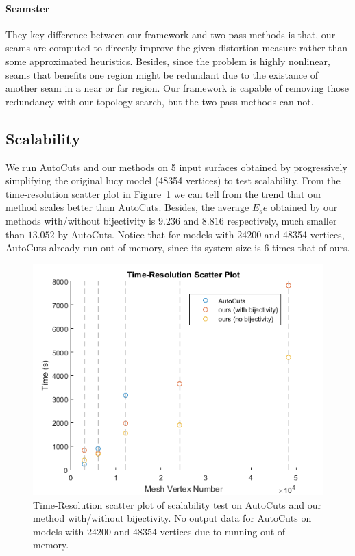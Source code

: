 \paragraph{Seamster}
They key difference between our framework and two-pass methods is that, our seams are computed to directly improve the given distortion measure rather than some approximated heuristics. Besides, since the problem is highly nonlinear, seams that benefits one region might be redundant due to the existance of another seam in a near or far region. Our framework is capable of removing those redundancy with our topology search, but the two-pass methods can not.


\subsection{Scalability}
We run AutoCuts and our methods on 5 input surfaces obtained by progressively simplifying the original lucy model (48354 vertices) to test scalability. From the time-resolution scatter plot in Figure~\ref{fig:time_res_scalability} we can tell from the trend that our method scales better than AutoCuts. Besides, the average $E_se$ obtained by our methods with/without bijectivity is $9.236$ and $8.816$ respectively, much smaller than $13.052$ by AutoCuts. Notice that for models with 24200 and 48354 vertices, AutoCuts already run out of memory, since its system size is $6$ times that of ours. 

\begin{figure}[!h]
\centering
\includegraphics[width=\linewidth]{fig/time_res_scalability.png}
\caption{Time-Resolution scatter plot of scalability test on AutoCuts and our method with/without bijectivity. No output data for AutoCuts on models with 24200 and 48354 vertices due to running out of memory.}
\label{fig:time_res_scalability}
\end{figure}


